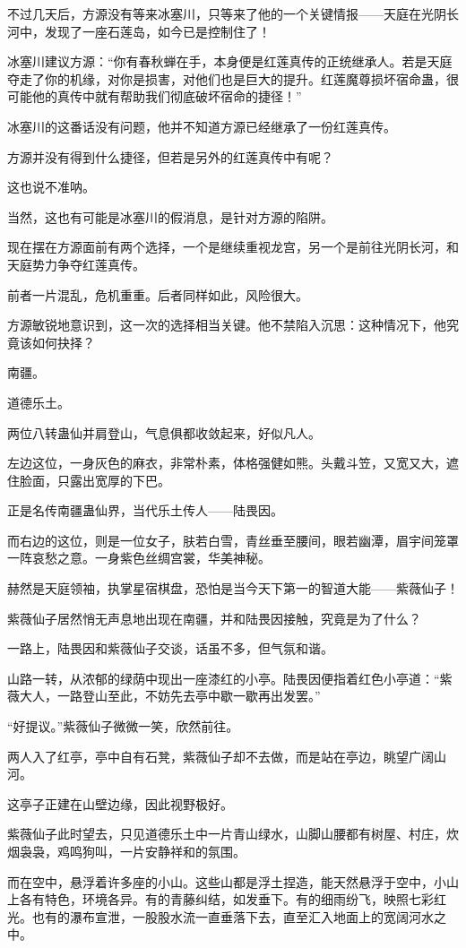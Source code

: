\begin{this_body}
不过几天后，方源没有等来冰塞川，只等来了他的一个关键情报——天庭在光阴长河中，发现了一座石莲岛，如今已是控制住了！

冰塞川建议方源：“你有春秋蝉在手，本身便是红莲真传的正统继承人。若是天庭夺走了你的机缘，对你是损害，对他们也是巨大的提升。红莲魔尊损坏宿命蛊，很可能他的真传中就有帮助我们彻底破坏宿命的捷径！”

冰塞川的这番话没有问题，他并不知道方源已经继承了一份红莲真传。

方源并没有得到什么捷径，但若是另外的红莲真传中有呢？

这也说不准呐。

当然，这也有可能是冰塞川的假消息，是针对方源的陷阱。

现在摆在方源面前有两个选择，一个是继续重视龙宫，另一个是前往光阴长河，和天庭势力争夺红莲真传。

前者一片混乱，危机重重。后者同样如此，风险很大。

方源敏锐地意识到，这一次的选择相当关键。他不禁陷入沉思：这种情况下，他究竟该如何抉择？

南疆。

道德乐土。

两位八转蛊仙并肩登山，气息俱都收敛起来，好似凡人。

左边这位，一身灰色的麻衣，非常朴素，体格强健如熊。头戴斗笠，又宽又大，遮住脸面，只露出宽厚的下巴。

正是名传南疆蛊仙界，当代乐土传人——陆畏因。

而右边的这位，则是一位女子，肤若白雪，青丝垂至腰间，眼若幽潭，眉宇间笼罩一阵哀愁之意。一身紫色丝绸宫裳，华美神秘。

赫然是天庭领袖，执掌星宿棋盘，恐怕是当今天下第一的智道大能——紫薇仙子！

紫薇仙子居然悄无声息地出现在南疆，并和陆畏因接触，究竟是为了什么？

一路上，陆畏因和紫薇仙子交谈，话虽不多，但气氛和谐。

山路一转，从浓郁的绿荫中现出一座漆红的小亭。陆畏因便指着红色小亭道：“紫薇大人，一路登山至此，不妨先去亭中歇一歇再出发罢。”

“好提议。”紫薇仙子微微一笑，欣然前往。

两人入了红亭，亭中自有石凳，紫薇仙子却不去做，而是站在亭边，眺望广阔山河。

这亭子正建在山壁边缘，因此视野极好。

紫薇仙子此时望去，只见道德乐土中一片青山绿水，山脚山腰都有树屋、村庄，炊烟袅袅，鸡鸣狗叫，一片安静祥和的氛围。

而在空中，悬浮着许多座的小山。这些山都是浮土捏造，能天然悬浮于空中，小山上各有特色，环境各异。有的青藤纠结，如发垂下。有的细雨纷飞，映照七彩红光。也有的瀑布宣泄，一股股水流一直垂落下去，直至汇入地面上的宽阔河水之中。


\end{this_body}

